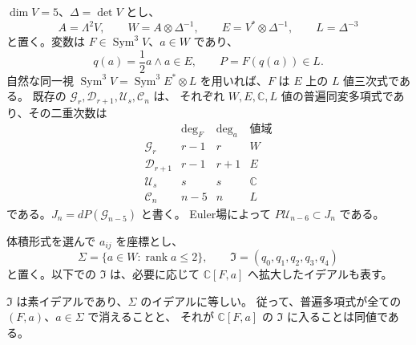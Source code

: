 $\dim V=5$、$\Delta=\det V$ とし、
\[
 A=\Lambda^2V,\qquad W=A\otimes\Delta^{-1},\qquad
 E=V^*\otimes\Delta^{-1},\qquad L=\Delta^{-3}
\]
と置く。変数は $F\in\operatorname{Sym}^3V$、$a\in W$ であり、
\[
 q(a)=\frac12a\wedge a\in E,\qquad P=F(q(a))\in L.
\]
自然な同一視
$\operatorname{Sym}^3V=\operatorname{Sym}^3E^*\otimes L$
を用いれば、$F$ は $E$ 上の $L$ 値三次式である。
既存の $\mathcal G_r,\mathcal D_{r+1},\mathcal U_s,\mathcal C_n$ は、
それぞれ $W,E,\mathbb C,L$ 値の普遍同変多項式であり、その二重次数は
\[
\begin{array}{c|cc|c}
 &\deg_F&\deg_a&\text{値域}\\\hline
 \mathcal G_r&r-1&r&W\\
 \mathcal D_{r+1}&r-1&r+1&E\\
 \mathcal U_s&s&s&\mathbb C\\
 \mathcal C_n&n-5&n&L
\end{array}
\]
である。$J_n=dP(\mathcal G_{n-5})$ と書く。
Euler場によって $P\mathcal U_{n-6}\subset J_n$ である。

体積形式を選んで $a_{ij}$ を座標とし、
\[
 \Sigma=\{a\in W:\operatorname{rank}a\le2\},\qquad
 \mathfrak I=(q_0,q_1,q_2,q_3,q_4)
\]
と置く。以下での $\mathfrak I$ は、必要に応じて
$\mathbb C[F,a]$ へ拡大したイデアルも表す。

\begin{lemma}[Pl\"ucker錐の被約なイデアル]
\label{lem:v16-plucker-prime-ideal}
$\mathfrak I$ は素イデアルであり、$\Sigma$ のイデアルに等しい。
従って、普遍多項式が全ての $(F,a)$、$a\in\Sigma$ で消えることと、
それが $\mathbb C[F,a]$ の $\mathfrak I$ に入ることは同値である。
\end{lemma}

